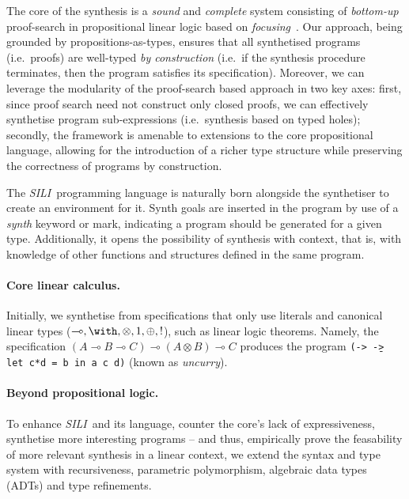 \documentclass{llncs}
\newcommand{\lolli}{\multimap}
\newcommand{\tensor}{\otimes}
\newcommand{\bang}{{!}}
\newcommand{\synname}{\emph{SILI}}
\begin{document}
The core of the synthesis is a \emph{sound} and \emph{complete} system
consisting of \emph{bottom-up} proof-search in propositional linear logic based
on \emph{focusing}~\cite{}. Our approach, being grounded by
propositions-as-types, ensures that all synthetised programs (i.e.~proofs) are
well-typed \emph{by construction} (i.e.~if the synthesis procedure terminates,
then the program satisfies its specification). Moreover, we can leverage the
modularity of the proof-search based approach in two key axes: first, since
proof search need not construct only closed proofs, we can effectively
synthetise program sub-expressions (i.e.~synthesis based on typed holes);
secondly, the framework is amenable to extensions to the core propositional
language, allowing for the introduction of a richer type structure while
preserving the correctness of programs by construction.

The \synname\ programming language is naturally born alongside the synthetiser
to create an environment for it. Synth goals are inserted in the program by use
of a \emph{synth} keyword or mark, indicating a program should be generated for a given
type. Additionally, it opens the possibility of synthesis with context, that is,
with knowledge of other functions and structures defined in the same program.


\paragraph{Core linear calculus.} Initially, we synthetise from
specifications that only use literals and canonical linear types ($\lolli, \with, \tensor, 1,
\oplus, \bang$), such as linear logic theorems. Namely,
the specification $(A \lolli B \lolli C) \lolli (A \tensor B) \lolli C$ produces
the program \texttt{(\a -> \b -> let c*d = b in a c d)}
(known as \emph{uncurry}).


\paragraph{Beyond propositional logic.} To enhance \synname\ and its language,
counter the core's lack of expressiveness, synthetise more interesting programs
-- and thus, empirically prove the feasability of more relevant synthesis in a
linear context, we extend the syntax and type system with recursiveness,
parametric polymorphism, algebraic data types (ADTs) and type refinements.

\end{document}
